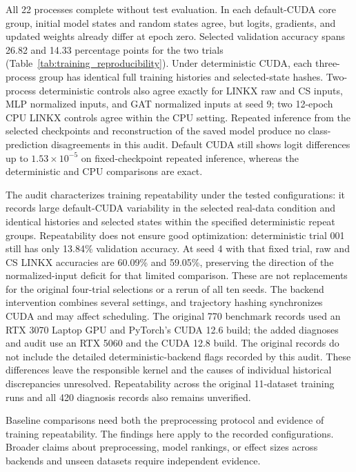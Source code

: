 All 22 processes complete without test evaluation. In each default-CUDA core group, initial model states and random states agree, but logits, gradients, and updated weights already differ at epoch zero. Selected validation accuracy spans 26.82 and 14.33 percentage points for the two trials (Table~\ref{tab:training_reproducibility}). Under deterministic CUDA, each three-process group has identical full training histories and selected-state hashes. Two-process deterministic controls also agree exactly for LINKX raw and CS inputs, MLP normalized inputs, and GAT normalized inputs at seed 9; two 12-epoch CPU LINKX controls agree within the CPU setting. Repeated inference from the selected checkpoints and reconstruction of the saved model produce no class-prediction disagreements in this audit. Default CUDA still shows logit differences up to $1.53\times10^{-5}$ on fixed-checkpoint repeated inference, whereas the deterministic and CPU comparisons are exact.

The audit characterizes training repeatability under the tested configurations: it records large default-CUDA variability in the selected real-data condition and identical histories and selected states within the specified deterministic repeat groups. Repeatability does not ensure good optimization: deterministic trial 001 still has only 13.84\% validation accuracy. At seed 4 with that fixed trial, raw and CS LINKX accuracies are 60.09\% and 59.05\%, preserving the direction of the normalized-input deficit for that limited comparison. These are not replacements for the original four-trial selections or a rerun of all ten seeds. The backend intervention combines several settings, and trajectory hashing synchronizes CUDA and may affect scheduling. The original 770 benchmark records used an RTX 3070 Laptop GPU and PyTorch's CUDA 12.6 build; the added diagnoses and audit use an RTX 5060 and the CUDA 12.8 build. The original records do not include the detailed deterministic-backend flags recorded by this audit. These differences leave the responsible kernel and the causes of individual historical discrepancies unresolved. Repeatability across the original 11-dataset training runs and all 420 diagnosis records also remains unverified.

Baseline comparisons need both the preprocessing protocol and evidence of training repeatability. The findings here apply to the recorded configurations. Broader claims about preprocessing, model rankings, or effect sizes across backends and unseen datasets require independent evidence.
